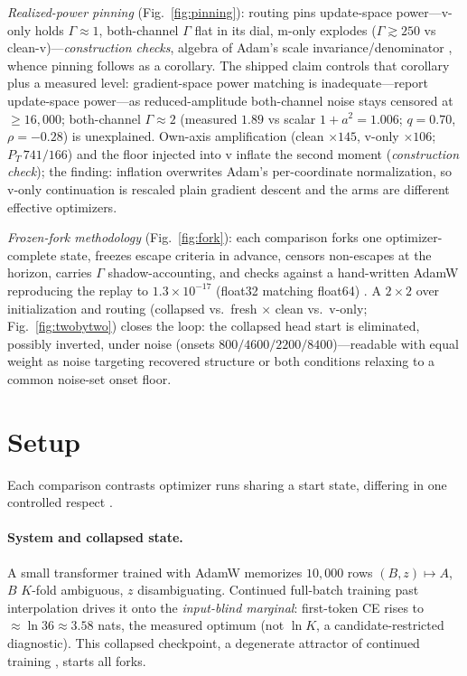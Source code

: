 \documentclass[10pt]{article}
\begin{document}
\emph{Realized-power pinning} (Fig.~\ref{fig:pinning}): routing pins update-space power---v-only holds $\Gamma\approx1$, both-channel $\Gamma$ flat in its dial, m-only explodes ($\Gamma\gtrsim250$ vs clean-v)---\emph{construction checks}, algebra of Adam's scale invariance/denominator \citep{adam}, whence pinning follows as a corollary. The shipped claim controls that corollary plus a measured level: gradient-space power matching is inadequate---report update-space power---as reduced-amplitude both-channel noise stays censored at $\ge16{,}000$; both-channel $\Gamma\approx2$ (measured $1.89$ vs scalar $1{+}a^2=1.006$; $q=0.70$, $\rho=-0.28$) is unexplained. Own-axis amplification (clean $\times145$, v-only $\times106$; $P_T\,741/166$) and the floor injected into v inflate the second moment (\emph{construction check}); the finding: inflation overwrites Adam's per-coordinate normalization, so v-only continuation is rescaled plain gradient descent and the arms are different effective optimizers.

\emph{Frozen-fork methodology} (Fig.~\ref{fig:fork}): each comparison forks one optimizer-complete state, freezes escape criteria in advance, censors non-escapes at the horizon, carries $\Gamma$ shadow-accounting, and checks against a hand-written AdamW reproducing the replay to $1.3{\times}10^{-17}$ (float32 matching float64) \citep{position}. A $2\times2$ over initialization and routing (collapsed vs.\ fresh $\times$ clean vs.\ v-only; Fig.~\ref{fig:twobytwo}) closes the loop: the collapsed head start is eliminated, possibly inverted, under noise (onsets $800/4600/2200/8400$)---readable with equal weight as noise targeting recovered structure or both conditions relaxing to a common noise-set onset floor.


\section{Setup}
\label{sec:setup}

Each comparison contrasts optimizer runs sharing a start state, differing in one controlled respect \citep{position}.

\paragraph{System and collapsed state.}
A small transformer trained with AdamW \citep{adam} memorizes $10{,}000$ rows $(B,z)\!\mapsto\!A$, $B$ $K$-fold ambiguous, $z$ disambiguating. Continued full-batch training past interpolation drives it onto the \emph{input-blind marginal}: first-token CE rises to $\approx\ln36\approx3.58$ nats, the measured optimum (not $\ln K$, a candidate-restricted diagnostic). This collapsed checkpoint, a degenerate attractor of continued training \citep{stochcollapse}, starts all forks.
\end{document}
